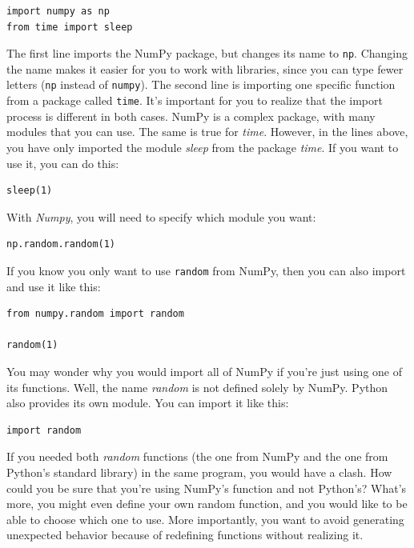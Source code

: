 \begin{verbatim}
import numpy as np
from time import sleep
\end{verbatim}

The first line imports the NumPy package, but changes its name to \texttt{np}. Changing the name makes it easier for you to work with libraries, since you can type fewer letters (\texttt{np} instead of \texttt{numpy}). The second line is importing one specific function from a package called \texttt{time}. It's important for you to realize that the import process is different in both cases. NumPy is a complex package, with many modules that you can use. The same is true for \emph{time}. However, in the lines above, you have only imported the module \emph{sleep} from the package \emph{time}. If you want to use it, you can do this:

\begin{verbatim}
sleep(1)
\end{verbatim}

With \emph{Numpy}, you will need to specify which module you want:

\begin{verbatim}
np.random.random(1)
\end{verbatim}

If you know you only want to use \texttt{random} from NumPy, then you can also import and use it like this:

\begin{verbatim}
from numpy.random import random

random(1)
\end{verbatim}

You may wonder why you would import all of NumPy if you're just using one of its functions. Well, the name \emph{random} is not defined solely by NumPy. Python also provides its own  module. You can import it like this:

\begin{verbatim}
import random
\end{verbatim}

If you needed both \emph{random} functions (the one from NumPy and the one from Python's standard library) in the same program, you would have a clash. How could you be sure that you're using NumPy's function and not Python's? What's more, you might even define your own random function, and you would like to be able to choose which one to use. More importantly, you want to avoid generating unexpected behavior because of redefining functions without realizing it.

